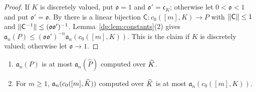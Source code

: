 \begin{proof}
If $K$ is discretely valued, put $\mathfrak o=1$ and $\mathfrak o'=\mathfrak c_K$; otherwise let $0<\mathfrak o<1$ and put $\mathfrak o'=\mathfrak o$. By \cite[Lemma~Q.13(3)]{I} there is a linear bijection $\mathsf C\colon c_0([m],K)\to P$ with $\lVert \mathsf C\rVert\le1$ and $\lVert \mathsf C^{-1}\rVert\le(\mathfrak o\mathfrak o')^{-1}$. Lemma~\ref{dp:lem:constants}(2) gives $\mathfrak a_n(P)\le(\mathfrak o\mathfrak o')^{-n}\mathfrak a_n(c_0([m],K))$. This is the claim if $K$ is discretely valued; otherwise let $\mathfrak o\to1$.
\end{proof}

\begin{lemma}[completion]\label{dp:lem:completion}
\leavevmode
\begin{enumerate}
\item $\mathfrak a_n(P)$ is at most $\mathfrak a_n(\widehat P)$ computed over $\widehat K$.
\item For $m\ge1$, $\mathfrak a_n(c_0([m],\widehat K))$ computed over $\widehat K$ is at most $\mathfrak a_n(c_0([m],K))$.
\end{enumerate}
\end{lemma}

